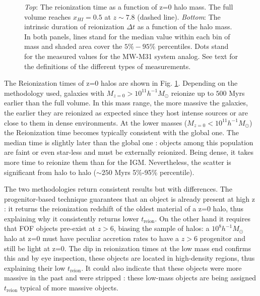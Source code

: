 \documentclass[twocolumn]{aastex61}
\begin{document}
\begin{figure}[ht]
\caption{\textit{Top}: The reionization time as a function of z=0 halo mass.
The full volume reaches $x_{HI}=0.5$ at $z\sim 7.8$ (dashed line). %
 \textit{Bottom}: The intrinsic duration of reionization  $\Delta t$ as a function of the halo mass. In both panels, lines stand for the median value within each bin of mass and  shaded area cover the $5\%-95\%$ percentiles. Dots stand for the measured values for the MW-M31 system analog. See text for the definitions of the different types of measurements.}
\label{fig:treion}
\end{figure}

The Reionization times of z=0 halos are shown in Fig. \ref{fig:treion}. Depending on the methodology used, galaxies with $M_{z=0}>10^{11} h^{-1}M_\odot$ reionize up to $500$ Myrs earlier than the full volume. In this mass range, the more massive the galaxies, the earlier they are reionized as expected since they host intense sources or are close to them in dense environments. At the lower masses ($M_{z=0}<10^{11} h^{-1}M_\odot$) the Reionization time becomes typically consistent with the global one.  The median time is slightly later than the global one : objects among this population are faint or even star-less and must be externally reionized. Being dense, it takes more time to reionize them than for the IGM.  Nevertheless, the scatter is significant from halo to halo ($\sim 250$ Myrs 5\%-95\% percentile).

The two methodologies return consistent results but with differences. The progenitor-based technique guarantees that an object is already present at high z : it returns the reionization redshift of the oldest material of a z=0 halo, thus explaining why it consistently returns lower $t_\mathrm{reion}$. On the other hand it requires that FOF objects pre-exist at $z>6$, biasing the sample of halos:  a $10^8 h^{-1} M_\odot$ halo at z=0  must have peculiar accretion rates to have a $z>6$ progenitor and still be light at z=0. The dip in reionization times at the low mass end confirms this and  by eye inspection, these objects are located in high-density regions, thus explaining their low $t_\mathrm{reion}$. It could also indicate that these objects were more massive in the past and were stripped : these low-mass objects are being assigned $t_\mathrm{reion}$ typical of more massive objects.
\end{document}
